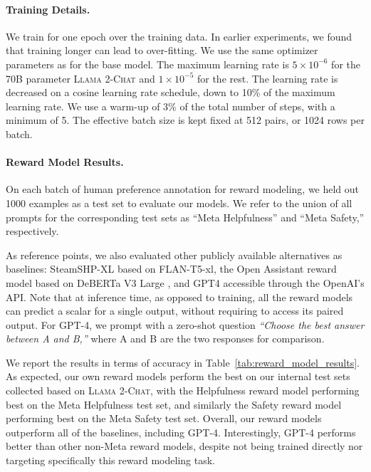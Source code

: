 \paragraph{Training Details.} We train for one epoch over the training data. In earlier experiments, we found that training longer can lead to over-fitting. We use the same optimizer parameters as for the base model. The maximum learning rate is $5\times10^{-6}$ for the 70B parameter \textsc{Llama 2-Chat} and $1\times10^{-5}$ for the rest. The learning rate is decreased on a cosine learning rate schedule, down to 10\% of the maximum learning rate. We use a warm-up of 3\% of the total number of steps, with a minimum of 5. The effective batch size is kept fixed at 512 pairs, or 1024 rows per batch. 

\paragraph{Reward Model Results.}
\label{sec:reward_model_results}

On each batch of human preference annotation for reward modeling, we held out 1000 examples as a test set to evaluate our models. We refer to the union of all prompts for the corresponding test sets as ``Meta Helpfulness'' and ``Meta Safety,'' respectively. 

As reference points, we also evaluated other publicly available alternatives as baselines: SteamSHP-XL \citep{SHP} based on FLAN-T5-xl, the Open Assistant \citep{kopf2023openassistant} reward model based on DeBERTa V3 Large \citep{deberta}, and GPT4 accessible through the OpenAI's API. Note that at inference time, as opposed to training, all the reward models can predict a scalar for a single output, without requiring to access its paired output. For GPT-4, we prompt with a zero-shot question \textit{``Choose the best answer between A and B,''} where A and B are the two responses for comparison. 

We report the results in terms of accuracy in Table~\ref{tab:reward_model_results}. 
As expected, our own reward models perform the best on our internal test sets collected based on \textsc{Llama 2-Chat}, with the Helpfulness reward model performing best on the Meta Helpfulness test set, and similarly the Safety reward model performing best on the Meta Safety test set. Overall, our reward models outperform all of the baselines, including GPT-4. Interestingly, GPT-4 performs better than other non-Meta reward models, despite not being trained directly nor targeting specifically this reward modeling task. 

